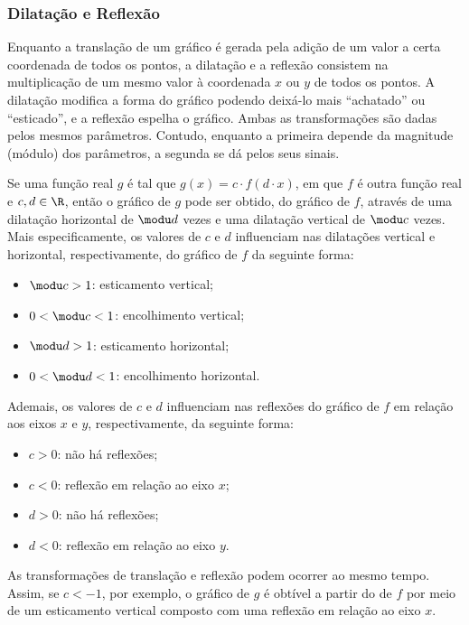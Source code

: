 \subsubsection{Dilatação e Reflexão}

Enquanto a translação de um gráfico é gerada pela adição de um valor a certa coordenada de todos os pontos, a dilatação e a reflexão consistem na multiplicação de um mesmo valor à coordenada $x$ ou $y$ de todos os pontos.
A dilatação modifica a forma do gráfico podendo deixá-lo mais ``achatado'' ou ``esticado'', e a reflexão espelha o gráfico.
Ambas as transformações são dadas pelos mesmos parâmetros.
Contudo, enquanto a primeira depende da magnitude (módulo) dos parâmetros, a segunda se dá pelos seus sinais.

Se uma função real $g$ é tal que $g(x) = c \cdot f(d\cdot x)$, em que $f$ é outra função real e $c,d\in \R$, então o gráfico de $g$ pode ser obtido, do gráfico de $f$, através de uma dilatação horizontal de $\modu d$ vezes e uma dilatação vertical de $\modu c$ vezes. 
Mais especificamente, os valores de $c$ e $d$ influenciam nas dilatações vertical e horizontal, respectivamente, do gráfico de $f$ da seguinte forma:
%
\begin{itemize}
          \item $\modu c>1$: esticamento vertical;
          \item $0<\modu c<1$: encolhimento vertical;
          \item $\modu d>1$: esticamento horizontal;
          \item $0<\modu d<1$: encolhimento horizontal.
\end{itemize}
%
Ademais, os valores de $c$ e $d$ influenciam nas reflexões do gráfico de $f$ em relação aos eixos $x$ e $y$, respectivamente, da seguinte forma:
%
\begin{itemize}
  \item $c > 0$: não há reflexões;
  \item $c < 0$: reflexão em relação ao eixo $x$;
  \item $d > 0$: não há reflexões;
  \item $d < 0$: reflexão em relação ao eixo $y$.
\end{itemize}

As transformações de translação e reflexão podem ocorrer ao mesmo tempo.
Assim, se $c<-1$, por exemplo, o gráfico de $g$ é obtível a partir do de $f$ por meio de um esticamento vertical composto com uma reflexão em relação ao eixo $x$.

